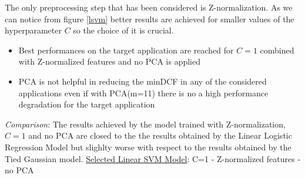 \documentclass[10pt, a4paper, twocolumn]{article} %
\begin{document}
The only preprocessing step that has been considered is Z-normalization. As we can notice from figure \ref{lsvm}
better results are achieved for smaller values of the hyperparameter $C$ so the choice of it is crucial.
\begin{itemize}
	\item Best performances on the target application are reached for $C=1$ combined with
		  Z-normalized features and no PCA is applied
	\item PCA is not helpful in reducing the minDCF in any of the considered applications
		  even if with PCA(m=11) there is no a high performance degradation for the target
		  application
\end{itemize}
\textit{Comparison}: The results achieved by the model trained with Z-normalization, 
$C=1$ and no PCA are closed to the the results obtained by the Linear Logistic Regression Model
but slighlty worse with respect to the results obtained by the Tied Gaussian model.
\underline{Selected Linear SVM Model}: C=1 - Z-normalized features - no PCA
\end{document}
